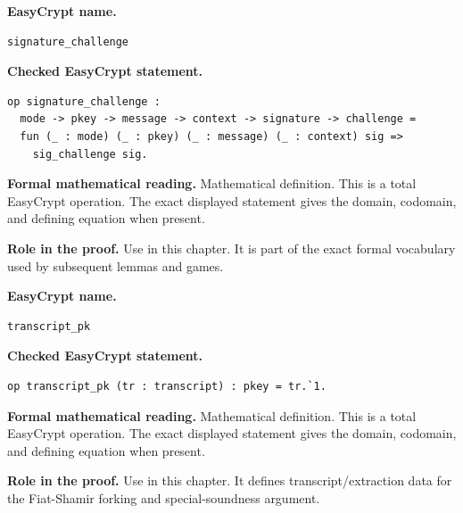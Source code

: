 \begin{formaldefinition}
\noindent\textbf{EasyCrypt name.}
\begin{lstlisting}[language=EasyCrypt,basicstyle=\ttfamily\scriptsize]
signature_challenge
\end{lstlisting}
\noindent\textbf{Checked EasyCrypt statement.}
\begin{lstlisting}[language=EasyCrypt,basicstyle=\ttfamily\scriptsize]
op signature_challenge :
  mode -> pkey -> message -> context -> signature -> challenge =
  fun (_ : mode) (_ : pkey) (_ : message) (_ : context) sig =>
    sig_challenge sig.
\end{lstlisting}
\noindent\textbf{Formal mathematical reading.}
Mathematical definition. This is a total EasyCrypt operation.  The exact displayed statement gives the domain, codomain, and defining equation when present.

\noindent\textbf{Role in the proof.}
Use in this chapter. It is part of the exact formal vocabulary used by subsequent lemmas and games.

\end{formaldefinition}

\begin{formaldefinition}
\noindent\textbf{EasyCrypt name.}
\begin{lstlisting}[language=EasyCrypt,basicstyle=\ttfamily\scriptsize]
transcript_pk
\end{lstlisting}
\noindent\textbf{Checked EasyCrypt statement.}
\begin{lstlisting}[language=EasyCrypt,basicstyle=\ttfamily\scriptsize]
op transcript_pk (tr : transcript) : pkey = tr.`1.
\end{lstlisting}
\noindent\textbf{Formal mathematical reading.}
Mathematical definition. This is a total EasyCrypt operation.  The exact displayed statement gives the domain, codomain, and defining equation when present.

\noindent\textbf{Role in the proof.}
Use in this chapter. It defines transcript/extraction data for the Fiat-Shamir forking and special-soundness argument.

\end{formaldefinition}


